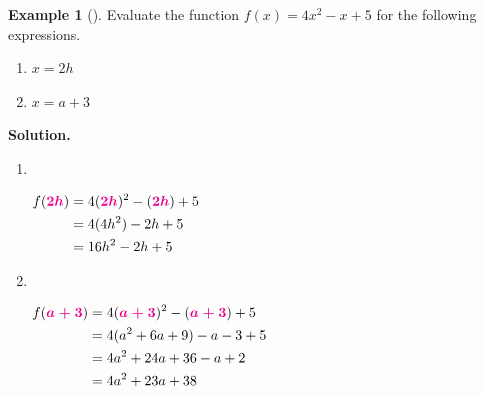 \documentclass[10pt,]{book}
\theoremstyle{plain}
\theoremstyle{definition}
\theoremstyle{definition}
\newtheorem{example}[theorem]{Example}
\theoremstyle{definition}
\newcommand{\alert}[1]{\boldsymbol{\color{magenta}{#1}}}
\newcommand{\amp}{&}
\begin{document}
\begin{example}[]\label{example-evaluate-quadratic}
Evaluate the function \(f(x)=4x^2 - x + 5\) for the following expressions.%
\leavevmode%
\begin{enumerate}[label=\alph*]
\item\hypertarget{li-53}{}\(x = 2h\)%
\item\hypertarget{li-54}{}\(x = a + 3\)%
\end{enumerate}
\par\medskip\noindent%
\textbf{Solution.}\quad \leavevmode%
\begin{enumerate}[label=\alph*]
\item\hypertarget{li-55}{}~%
\par
\(\begin{aligned}
f(\alert{2h}) \amp= 4(\alert{2h})^2-(\alert{2h}) + 5\\
\amp= 4(4h^2)-2h+5\\
\amp= 16h^2 - 2h + 5\\ 
\end{aligned}\)%
\item\hypertarget{li-56}{}~%
\par
\(\begin{aligned}
f(\alert{a+3}) \amp= 4(\alert{a+3})^2-(\alert{a+3})+5\\
\amp= 4(a^2+6a+9)-a-3+5\\
\amp= 4a^2+24a+36 - a + 2\\
\amp= 4a^2+23a + 38\\
\end{aligned}\)%
\end{enumerate}
\end{example}
\typeout{************************************************}
\typeout{************************************************}
\end{document}
